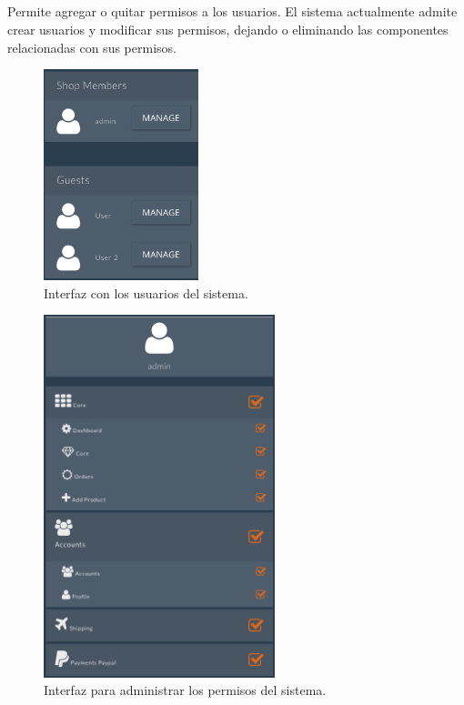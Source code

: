 
\subsection{\accountsEF}

	Permite agregar o quitar permisos a los usuarios. El sistema actualmente admite crear usuarios y modificar sus permisos, dejando o eliminando las componentes relacionadas con sus permisos.

	\begin{figure}[H]
		\centering
		\includegraphics[width=0.4\textwidth]{figuras/account/permission/users.png}
		\caption{Interfaz con los usuarios del sistema.}
		\label{figure:account:permission:users}
	\end{figure}


	\begin{figure}[H]
		\centering
		\includegraphics[width=0.6\textwidth]{figuras/account/permission/edit.png}
		\caption{Interfaz para administrar los permisos del sistema.}
		\label{figure:account:permission:edit}
	\end{figure}


